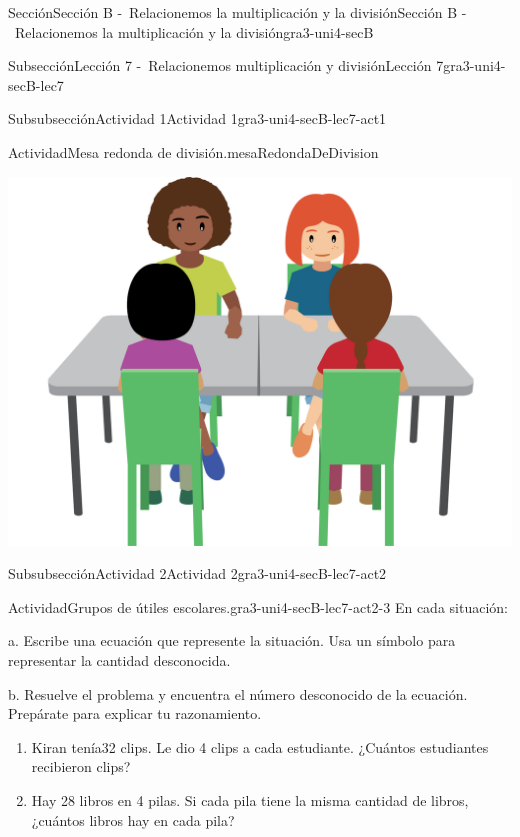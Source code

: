 \documentclass[twoside,10pt,]{article}
\newlength{\fillinmaxwidth}
\newlength{\fillincontract}
\newlength{\fillinheight}
\newcommand{\fillintext}[1]{%
\setlength{\fillinmaxwidth}{#1em*\real{0.5}}%
\setlength{\fillincontract}{#1em*\real{0.5}*\real{0.2}}%
\setlength{\fillinheight}{\heightof{\strut}+1.2pt}%
\strut\nobreak\leaders\vbox{\hrule width 0.3pt height 0.3pt \vskip -1.2pt}\hskip 1\fillinmaxwidth minus \fillincontract\nobreak\strut%
}
\begin{document}
\begin{sectionptx}{Sección}{Sección B -~Relacionemos la multiplicación y la división}{}{Sección B -~Relacionemos la multiplicación y la división}{}{}{gra3-uni4-secB}
\begin{subsectionptx}{Subsección}{Lección 7 -~Relacionemos multiplicación y división}{}{Lección 7}{}{}{gra3-uni4-secB-lec7}
\begin{subsubsectionptx}{Subsubsección}{Actividad 1}{}{Actividad 1}{}{}{gra3-uni4-secB-lec7-act1}
\begin{activity}{Actividad}{Mesa redonda de división.}{mesaRedondaDeDivision}
\begin{image}{0.2}{0.6}{0.2}{}
\includegraphics[width=\linewidth]{external/png-source/CS 3.4 Lesson 7 Activity 1.png}
\end{image}%
\end{activity}%
\end{subsubsectionptx}
%
%
\typeout{************************************************}
\typeout{************************************************}
%
\begin{subsubsectionptx}{Subsubsección}{Actividad 2}{}{Actividad 2}{}{}{gra3-uni4-secB-lec7-act2}
\begin{activity}{Actividad}{Grupos de útiles escolares.}{gra3-uni4-secB-lec7-act2-3}%
En cada situación:%
\par
a. Escribe una ecuación que represente la situación. Usa un símbolo para representar la cantidad desconocida.%
\par
b. Resuelve el problema y encuentra el número desconocido de la ecuación. Prepárate para explicar tu razonamiento.%
%
\begin{enumerate}
\item{}Kiran tenía32 clips. Le dio 4 clips a cada estudiante. ¿Cuántos estudiantes recibieron clips?%
%
\item{}Hay 28 libros en 4 pilas. Si cada pila tiene la misma cantidad de libros, ¿cuántos libros hay en cada pila?%
%
\end{enumerate}
\end{activity}
\end{subsubsectionptx}
\end{subsectionptx}
\end{sectionptx}
\end{document}
